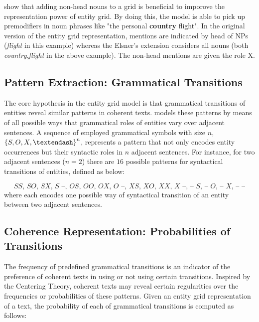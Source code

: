 \cite{elsner11a} show that adding non-head nouns to a grid is beneficial to imporove the representation power of entity grid.
By doing this, the model is able to pick up premodifiers in noun phrases like "the personal \textbf{country} flight". 
In the original version of the entity grid representation, mentions are indicated by head of NPs (\emph{flight} in this example) whereas the Elsner's extension considers all nouns (both \emph{country},\emph{flight} in the above example). 
The non-head mentions are given the role X. 

\subsection{Pattern Extraction: Grammatical Transitions}
%
The core hypothesis in the entity grid model is that grammatical transitions of entities reveal similar patterns in coherent texts. 
 models these patterns by means of all possible ways that grammatical roles of entities vary over adjacent sentences. 
A sequence of employed grammatical symbols with size $n$, $\left \{S,O,X,\-–\right \}^n$, represents a pattern that not only encodes entity occurrences but their syntactic roles in $n$ adjacent sentences. 
For instance, for two adjacent sentences ($n=2$) there are $16$ possible patterns for syntactical transitions of entities, defined as below:

\begin{equation}
S S\textit{, }S O\textit{, } S X\textit{, } S \textit{ --, }  O S\textit{, }O O\textit{, }O X\textit{, }  O \textit{ --, }  X S\textit{, }  X O\textit{, }  X X\textit{, } X \textit{ --, -- }S\textit{, -- }O\textit{, -- }X\textit{, -- --}  
\end{equation}
%
where each encodes one possible way of syntactical transition of an entity between two adjacent sentences. 

\subsection{Coherence Representation: Probabilities of Transitions}
%
The frequency of predefined grammatical transitions is an indicator of the preference of coherent texts in using or not using certain transitions. 
Inspired by the Centering Theory, coherent texts may reveal certain regularities over the frequencies or probabilities of these patterns. 
Given an entity grid representation of a text, the probability of each of grammatical transitions is computed as follows:

